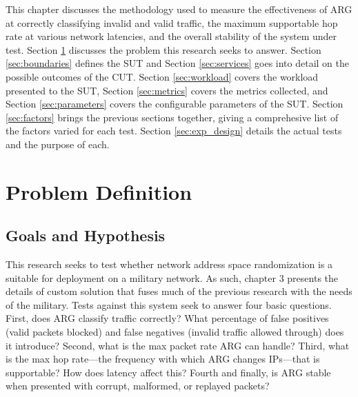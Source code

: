 \label{chp:methodology}

\par This chapter discusses the methodology used to measure the effectiveness of \ac{ARG} at correctly classifying invalid and valid traffic, the maximum supportable hop rate at various network latencies, and the overall stability of the system under test. Section \ref{sec:problem_def} discusses the problem this research seeks to answer. Section \ref{sec:boundaries} defines the \ac{SUT} and Section \ref{sec:services} goes into detail on the possible outcomes of the \ac{CUT}. Section \ref{sec:workload} covers the workload presented to the \ac{SUT}, Section \ref{sec:metrics} covers the metrics collected, and Section \ref{sec:parameters} covers the configurable parameters of the \ac{SUT}. Section \ref{sec:factors} brings the previous sections together, giving a comprehesive list of the factors varied for each test. Section \ref{sec:exp_design} details the actual tests and the purpose of each.

\section{Problem Definition}
\label{sec:problem_def}
\subsection{Goals and Hypothesis}
\label{sec:goals}
\par This research seeks to test whether network address space randomization is a suitable for deployment on a military network. As such, chapter 3 presents the details of custom solution that fuses much of the previous research with the needs of the military. Tests against this system seek to answer four basic questions.  First, does \ac{ARG} classify traffic correctly? What percentage of false positives (valid packets blocked) and false negatives (invalid traffic allowed through) does it introduce? Second, what is the max packet rate \ac{ARG} can handle? Third, what is the max hop rate---the frequency with which \ac{ARG} changes \acp{IP}---that is supportable? How does latency affect this? Fourth and finally, is \ac{ARG} stable when presented with corrupt, malformed, or replayed packets?


